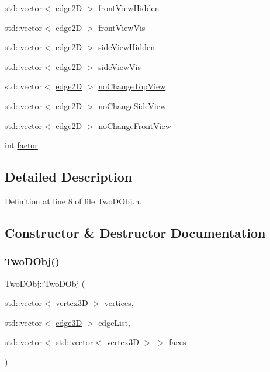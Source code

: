 \begin{DoxyCompactItemize}
\item 
std\+::vector$<$ \mbox{\hyperlink{structedge2_d}{edge2D}} $>$ \mbox{\hyperlink{class_two_d_obj_a0358e12e432b205f285cb0b4d93c9b08}{front\+View\+Hidden}}
\item 
std\+::vector$<$ \mbox{\hyperlink{structedge2_d}{edge2D}} $>$ \mbox{\hyperlink{class_two_d_obj_a6356dfc471d169e62f446b976ecd5137}{front\+View\+Vis}}
\item 
std\+::vector$<$ \mbox{\hyperlink{structedge2_d}{edge2D}} $>$ \mbox{\hyperlink{class_two_d_obj_a7ac59f63f8dddd766ede7537e4f56b6a}{side\+View\+Hidden}}
\item 
std\+::vector$<$ \mbox{\hyperlink{structedge2_d}{edge2D}} $>$ \mbox{\hyperlink{class_two_d_obj_a813fa6689e1481cb6a0b851d925785bd}{side\+View\+Vis}}
\item 
std\+::vector$<$ \mbox{\hyperlink{structedge2_d}{edge2D}} $>$ \mbox{\hyperlink{class_two_d_obj_aac0ab19af33023cf9cb3239ba1f808a0}{no\+Change\+Top\+View}}
\item 
std\+::vector$<$ \mbox{\hyperlink{structedge2_d}{edge2D}} $>$ \mbox{\hyperlink{class_two_d_obj_a6e5f8b57df6335a38d66703fb472e9ca}{no\+Change\+Side\+View}}
\item 
std\+::vector$<$ \mbox{\hyperlink{structedge2_d}{edge2D}} $>$ \mbox{\hyperlink{class_two_d_obj_af5049f5e28dc1331242955c4d7f5739c}{no\+Change\+Front\+View}}
\item 
int \mbox{\hyperlink{class_two_d_obj_a5ef060838790b5e927a9be217ca082e0}{factor}}
\end{DoxyCompactItemize}


\subsection{Detailed Description}


Definition at line 8 of file Two\+D\+Obj.\+h.



\subsection{Constructor \& Destructor Documentation}
\mbox{\label{class_two_d_obj_aa3c92bdec23c2c687b3e238934e24590}} 
\subsubsection{\texorpdfstring{Two\+D\+Obj()}{TwoDObj()}}
{\footnotesize\ttfamily Two\+D\+Obj\+::\+Two\+D\+Obj (\begin{DoxyParamCaption}\item[{std\+::vector$<$ \mbox{\hyperlink{structvertex3_d}{vertex3D}} $>$}]{vertices,  }\item[{std\+::vector$<$ \mbox{\hyperlink{structedge3_d}{edge3D}} $>$}]{edge\+List,  }\item[{std\+::vector$<$ std\+::vector$<$ \mbox{\hyperlink{structvertex3_d}{vertex3D}} $>$ $>$}]{faces }\end{DoxyParamCaption})}



